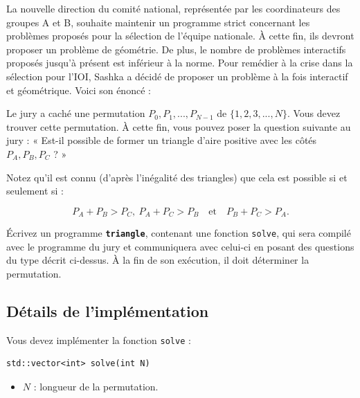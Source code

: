\documentclass[12pt]{article}
\begin{document}
\renewcommand{\headerLang}{French}
\renewcommand{\problemName}{AB23. TRIANGLE}

\renewcommand{\headerLeft}{IATI Day 2, Senior group}
\renewcommand{\headerRightFirst}{XVII INTERNATIONAL ADVANCED TOURNAMENT IN INFORMATICS}
\renewcommand{\headerRightSecond}{ONLINE 2026}

\renewcommand{\tl}{$10$ sec.}
\renewcommand{\ml}{$1024$ MB}
\problem{Problem \problemName}



La nouvelle direction du comité national, représentée par les coordinateurs des groupes A et B, souhaite maintenir un programme strict concernant les problèmes proposés pour la sélection de l'équipe nationale. À cette fin, ils devront proposer un problème de géométrie. De plus, le nombre de problèmes interactifs proposés jusqu'à présent est inférieur à la norme. Pour remédier à la crise dans la sélection pour l'IOI, Sashka a décidé de proposer un problème à la fois interactif et géométrique. Voici son énoncé :

Le jury a caché une permutation $P_0,P_1,...,P_{N-1}$ de $\{1,2,3,...,N\}$. Vous devez trouver cette permutation. À cette fin, vous pouvez poser la question suivante au jury : « Est-il possible de former un triangle d'aire positive avec les côtés $P_A,P_B,P_C$ ? »

Notez qu'il est connu (d'après l'inégalité des triangles) que cela est possible si et seulement si :

\[P_A + P_B > P_C,\ P_A + P_C > P_B \quad \text{et} \quad P_B + P_C > P_A.\]

Écrivez un programme \textbf{\texttt{triangle}}, contenant une fonction \texttt{solve}, qui sera compilé avec le programme du jury et communiquera avec celui-ci en posant des questions du type décrit ci-dessus. À la fin de son exécution, il doit déterminer la permutation.

\subsection{Détails de l'implémentation}
Vous devez implémenter la fonction \texttt{solve} :
\begin{lstlisting}
std::vector<int> solve(int N)
\end{lstlisting}
\begin{itemize}
    \item $N$ : longueur de la permutation.
\end{itemize}
\end{document}
